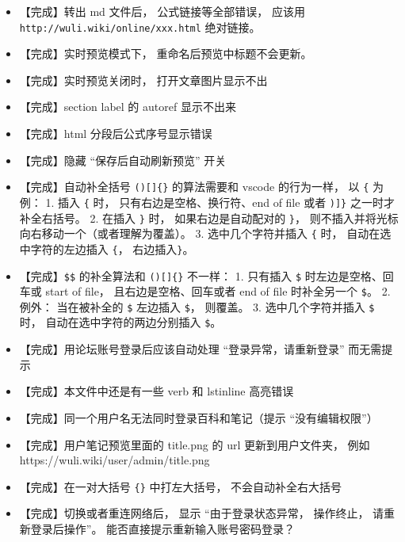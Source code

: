 \begin{itemize}
\item 【完成】转出 md 文件后， 公式链接等全部错误， 应该用 \verb`http://wuli.wiki/online/xxx.html` 绝对链接。

\item 【完成】实时预览模式下， 重命名后预览中标题不会更新。

\item 【完成】实时预览关闭时， 打开文章图片显示不出

\item 【完成】section label 的 autoref 显示不出来

\item 【完成】html 分段后公式序号显示错误

\item 【完成】隐藏 “保存后自动刷新预览” 开关

\item 【完成】自动补全括号 \verb`()[]{}` 的算法需要和 vscode 的行为一样， 以 \verb`{` 为例： 1. 插入 \verb`{` 时， 只有右边是空格、换行符、end of file 或者 \verb`)]}` 之一时才补全右括号。 2.  在插入 \verb`}` 时， 如果右边是自动配对的 \verb`}`， 则不插入并将光标向右移动一个（或者理解为覆盖）。 3. 选中几个字符并插入 \verb`{` 时， 自动在选中字符的左边插入 \verb`{`， 右边插入\verb`}`。

\item 【完成】\verb`$$` 的补全算法和 \verb`()[]{}` 不一样： 1. 只有插入 \verb`$` 时左边是空格、回车或 start of file， 且右边是空格、回车或者 end of file 时补全另一个 \verb`$`。 2. 例外： 当在被补全的 \verb`$` 左边插入 \verb`$`， 则覆盖。 3. 选中几个字符并插入 \verb`$` 时， 自动在选中字符的两边分别插入 \verb`$`。

\item 【完成】用论坛账号登录后应该自动处理 “登录异常，请重新登录” 而无需提示

\item 【完成】本文件中还是有一些 verb 和 lstinline 高亮错误

\item 【完成】同一个用户名无法同时登录百科和笔记（提示 “没有编辑权限”）

\item 【完成】用户笔记预览里面的 title.png 的 url 更新到用户文件夹， 例如 https://wuli.wiki/user/admin/title.png

\item 【完成】在一对大括号 \verb`{}` 中打左大括号， 不会自动补全右大括号

\item 【完成】切换或者重连网络后， 显示 “由于登录状态异常， 操作终止， 请重新登录后操作”。 能否直接提示重新输入账号密码登录？


\end{itemize}
